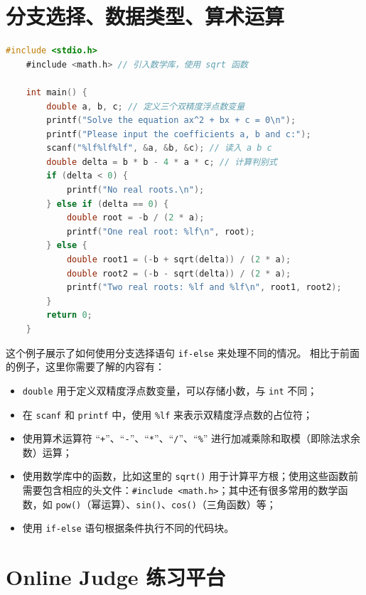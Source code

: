 \documentclass[lang=cn,newtx,10pt,scheme=chinese]{elegantbook}
\begin{document}
\section{分支选择、数据类型、算术运算}

\begin{lstlisting}[language=C]
    #include <stdio.h>
    #include <math.h> // 引入数学库，使用 sqrt 函数

    int main() {
        double a, b, c; // 定义三个双精度浮点数变量
        printf("Solve the equation ax^2 + bx + c = 0\n");
        printf("Please input the coefficients a, b and c:");
        scanf("%lf%lf%lf", &a, &b, &c); // 读入 a b c
        double delta = b * b - 4 * a * c; // 计算判别式
        if (delta < 0) {
            printf("No real roots.\n");
        } else if (delta == 0) {
            double root = -b / (2 * a);
            printf("One real root: %lf\n", root);
        } else {
            double root1 = (-b + sqrt(delta)) / (2 * a);
            double root2 = (-b - sqrt(delta)) / (2 * a);
            printf("Two real roots: %lf and %lf\n", root1, root2);
        }
        return 0;
    }
\end{lstlisting}

这个例子展示了如何使用分支选择语句 \lstinline{if-else} 来处理不同的情况。
相比于前面的例子，这里你需要了解的内容有：

\begin{itemize}
    \item \lstinline{double} 用于定义双精度浮点数变量，可以存储小数，与 \lstinline{int} 不同；
    \item 在 \lstinline{scanf} 和 \lstinline{printf} 中，使用 \lstinline{%lf} 来表示双精度浮点数的占位符；
    \item 使用算术运算符 “\lstinline{+}”、“\lstinline{-}”、“\lstinline{*}”、“\lstinline{/}”、“\lstinline{%}” 进行加减乘除和取模（即除法求余数）运算；
    \item 使用数学库中的函数，比如这里的 \lstinline{sqrt()} 用于计算平方根；使用这些函数前需要包含相应的头文件：\lstinline{#include <math.h>}；其中还有很多常用的数学函数，如 \lstinline{pow()}（幂运算）、\lstinline{sin()}、\lstinline{cos()}（三角函数）等；
    \item 使用 \lstinline{if-else} 语句根据条件执行不同的代码块。
\end{itemize}

\section{Online Judge 练习平台}
\end{document}
